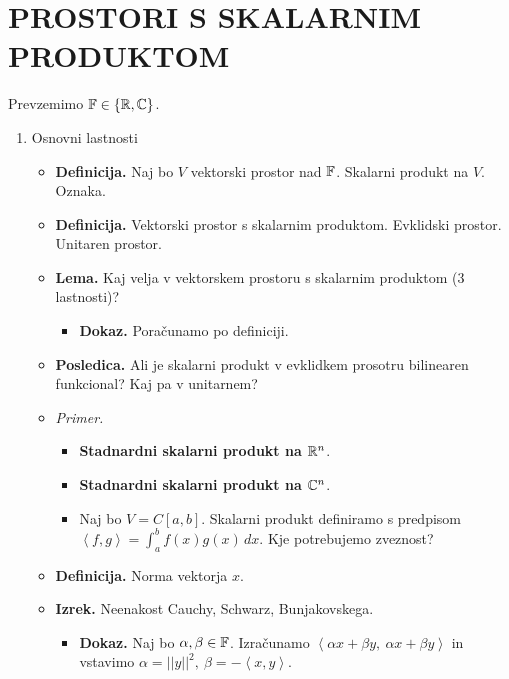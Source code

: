 \section{PROSTORI S SKALARNIM PRODUKTOM}
Prevzemimo $\mathbb{F} \in \left\{\mathbb{R}, \mathbb{C}\right\}$.
\begin{enumerate}
    \item Osnovni lastnosti
    \begin{itemize}
        \item \colorbox{purple!30}{\textbf{Definicija.}} Naj bo $V$ vektorski prostor nad $\mathbb{F}$. Skalarni produkt na $V$. Oznaka.
        \item \colorbox{purple!30}{\textbf{Definicija.}} Vektorski prostor s skalarnim produktom. Evklidski prostor. Unitaren prostor.
        \item \colorbox{blue!30}{\textbf{Lema.}} Kaj velja v vektorskem prostoru s skalarnim produktom (3 lastnosti)?
        \begin{itemize}
            \item \colorbox{green!30}{\textbf{Dokaz.}} Poračunamo po definiciji.
        \end{itemize} 
        \item \colorbox{orange!30}{\textbf{Posledica.}} Ali je skalarni produkt v evklidkem prosotru bilinearen funkcional? Kaj pa v unitarnem? 
        \item \colorbox{yellow!30}{\emph{Primer.}}         
        \begin{itemize}
            \item \textbf{Stadnardni skalarni produkt na $\mathbb{R}^n$}.
            \item \textbf{Stadnardni skalarni produkt na $\mathbb{C}^n$}.
            \item Naj bo $V = C[a,b]$. Skalarni produkt definiramo s predpisom $\left\langle f,g \right\rangle = \int_{a}^{b}f(x)g(x) \, dx$. Kje potrebujemo zveznost?
        \end{itemize}
        \item \colorbox{purple!30}{\textbf{Definicija.}} Norma vektorja $x$.        
        \item \colorbox{blue!30}{\textbf{Izrek.}} Neenakost Cauchy, Schwarz, Bunjakovskega.
        \begin{itemize}
            \item \colorbox{green!30}{\textbf{Dokaz.}} Naj bo $\alpha, \beta \in \mathbb{F}$. Izračunamo $\left\langle \alpha x + \beta y, \ \alpha x + \beta y \right\rangle$ in vstavimo $\alpha = ||y||^2, \ \beta = -\left\langle x, y\right\rangle$.

\end{itemize}
\end{itemize}
\end{enumerate}

